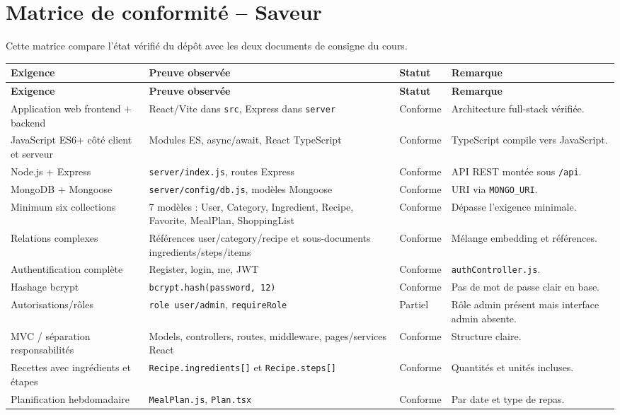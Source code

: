 \documentclass[12pt,a4paper]{article}
\begin{document}
\section*{Matrice de conformité -- Saveur}
Cette matrice compare l'état vérifié du dépôt avec les deux documents de consigne du cours.
\begin{longtable}{p{5cm}p{5.5cm}p{3cm}p{4cm}}
\toprule
\textbf{Exigence} & \textbf{Preuve observée} & \textbf{Statut} & \textbf{Remarque} \\
\midrule
\endfirsthead
\toprule
\textbf{Exigence} & \textbf{Preuve observée} & \textbf{Statut} & \textbf{Remarque} \\
\midrule
\endhead
Application web frontend + backend & React/Vite dans \texttt{src}, Express dans \texttt{server} & Conforme & Architecture full-stack vérifiée. \\
JavaScript ES6+ côté client et serveur & Modules ES, async/await, React TypeScript & Conforme & TypeScript compile vers JavaScript. \\
Node.js + Express & \texttt{server/index.js}, routes Express & Conforme & API REST montée sous \texttt{/api}. \\
MongoDB + Mongoose & \texttt{server/config/db.js}, modèles Mongoose & Conforme & URI via \texttt{MONGO\_URI}. \\
Minimum six collections & 7 modèles : User, Category, Ingredient, Recipe, Favorite, MealPlan, ShoppingList & Conforme & Dépasse l'exigence minimale. \\
Relations complexes & Références user/category/recipe et sous-documents ingredients/steps/items & Conforme & Mélange embedding et références. \\
Authentification complète & Register, login, me, JWT & Conforme & \texttt{authController.js}. \\
Hashage bcrypt & \texttt{bcrypt.hash(password, 12)} & Conforme & Pas de mot de passe clair en base. \\
Autorisations/rôles & \texttt{role user/admin}, \texttt{requireRole} & Partiel & Rôle admin présent mais interface admin absente. \\
MVC / séparation responsabilités & Models, controllers, routes, middleware, pages/services React & Conforme & Structure claire. \\
Recettes avec ingrédients et étapes & \texttt{Recipe.ingredients[]} et \texttt{Recipe.steps[]} & Conforme & Quantités et unités incluses. \\
Planification hebdomadaire & \texttt{MealPlan.js}, \texttt{Plan.tsx} & Conforme & Par date et type de repas. \\

\end{longtable}
\end{document}
